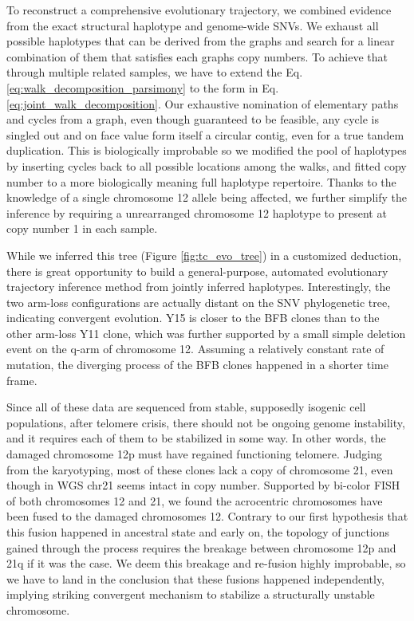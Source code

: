 \documentclass[phd,tocprelim]{cornell}
\begin{document}
To reconstruct a comprehensive evolutionary trajectory, we combined evidence from the exact structural haplotype and genome-wide SNVs. We exhaust all possible haplotypes that can be derived from the graphs and search for a linear combination of them that satisfies each graphs copy numbers. To achieve that through multiple related samples, we have to extend the Eq. \ref{eq:walk_decomposition_parsimony} to the form in Eq. \ref{eq:joint_walk_decomposition}. Our exhaustive nomination of elementary paths and cycles from a graph, even though guaranteed to be feasible, any cycle is singled out and on face value form itself a circular contig, even for a true tandem duplication. This is biologically improbable so we modified the pool of haplotypes by inserting cycles back to all possible locations among the walks, and fitted copy number to a more biologically meaning full haplotype repertoire. Thanks to the knowledge of a single chromosome 12 allele being affected, we further simplify the inference by requiring a unrearranged chromosome 12 haplotype to present at copy number 1 in each sample.

\clearpage
While we inferred this tree (Figure \ref{fig:tc_evo_tree}) in a customized deduction, there is great opportunity to build a general-purpose, automated evolutionary trajectory inference method from jointly inferred haplotypes. Interestingly, the two arm-loss configurations are actually distant on the SNV phylogenetic tree, indicating convergent evolution. Y15 is closer to the BFB clones than to the other arm-loss Y11 clone, which was further supported by a small simple deletion event on the q-arm of chromosome 12. Assuming a relatively constant rate of mutation, the diverging process of the BFB clones happened in a shorter time frame. 

Since all of these data are sequenced from stable, supposedly isogenic cell populations, after telomere crisis, there should not be ongoing genome instability, and it requires each of them to be stabilized in some way. In other words, the damaged chromosome 12p must have regained functioning telomere. Judging from the karyotyping, most of these clones lack a copy of chromosome 21, even though in WGS chr21 seems intact in copy number. Supported by bi-color FISH of both chromosomes 12 and 21, we found the acrocentric chromosomes have been fused to the damaged chromosomes 12. Contrary to our first hypothesis that this fusion happened in ancestral state and early on, the topology of junctions gained through the process requires the breakage between chromosome 12p and 21q if it was the case. We deem this breakage and re-fusion highly improbable, so we have to land in the conclusion that these fusions happened independently, implying striking convergent mechanism to stabilize a structurally unstable chromosome. 
\end{document}
